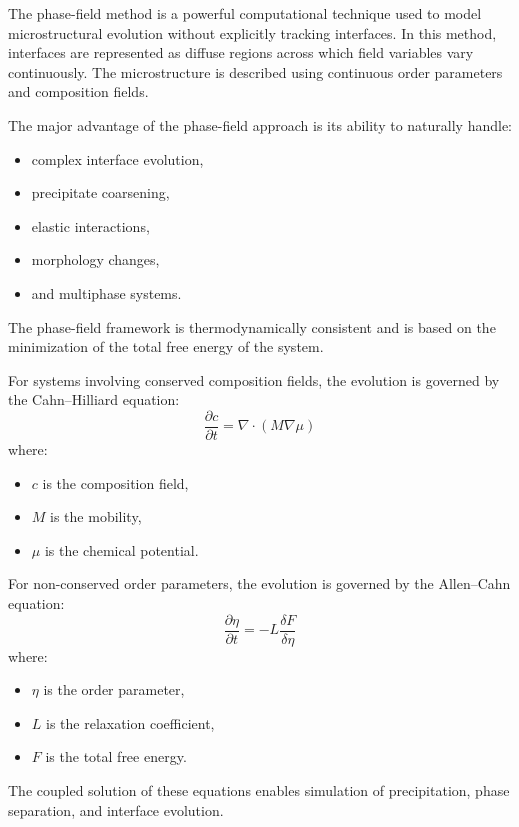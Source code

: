 The phase-field method is a powerful computational technique used to model microstructural evolution without explicitly tracking interfaces. In this method, interfaces are represented as diffuse regions across which field variables vary continuously. The microstructure is described using continuous order parameters and composition fields.

The major advantage of the phase-field approach is its ability to naturally handle:
\begin{itemize}
    \item complex interface evolution,
    \item precipitate coarsening,
    \item elastic interactions,
    \item morphology changes,
    \item and multiphase systems.
\end{itemize}

The phase-field framework is thermodynamically consistent and is based on the minimization of the total free energy of the system.

For systems involving conserved composition fields, the evolution is governed by the Cahn–Hilliard equation:
\begin{equation}
\frac{\partial c}{\partial t}=\nabla\cdot\left(M\nabla\mu\right)
\end{equation}
where:
\begin{itemize}
    \item $c$ is the composition field,
    \item $M$ is the mobility,
    \item $\mu$ is the chemical potential.
\end{itemize}

For non-conserved order parameters, the evolution is governed by the Allen–Cahn equation:
\begin{equation}
\frac{\partial \eta}{\partial t}=-L\frac{\delta F}{\delta \eta}
\end{equation}
where:
\begin{itemize}
    \item $\eta$ is the order parameter,
    \item $L$ is the relaxation coefficient,
    \item $F$ is the total free energy.
\end{itemize}

The coupled solution of these equations enables simulation of precipitation, phase separation, and interface evolution.


